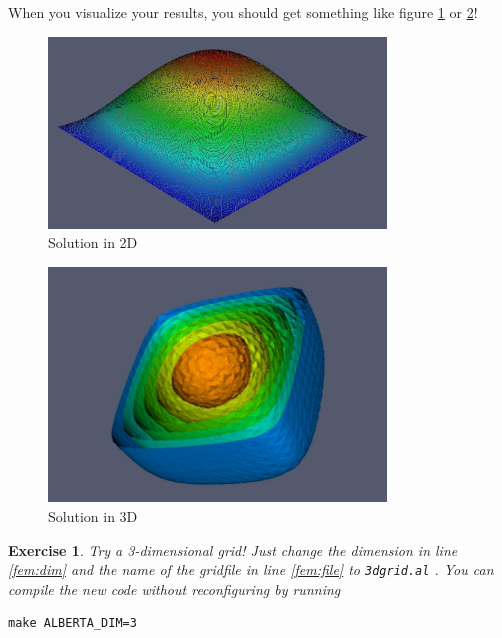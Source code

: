 \documentclass[11pt,a4paper,headinclude,footinclude,DIV16,normalheadings]{scrreprt}
\newtheorem{exc}{Exercise}[chapter]
\begin{document}
When you visualize your results, you should get something like figure \ref{Fig:FEM1} or \ref{Fig:FEM2}!

\begin{figure}[h]
\label{Fig:FEM1}
\begin{center}
\includegraphics[width=0.8\textwidth]{./EPS/fem2d} 
\caption{Solution in 2D}
\end{center}
\end{figure}

\begin{figure}[h]
\label{Fig:FEM2}
\begin{center}
\includegraphics[width=0.8\textwidth]{./EPS/fem3d} 
\caption{Solution in 3D}
\end{center}
\end{figure}

\begin{exc}
 Try a 3-dimensional grid! Just change the dimension in line \ref{fem:dim} and the name of the gridfile in line \ref{fem:file} to \lstinline!3dgrid.al! . You can compile the new code without reconfiguring by running
\begin{lstlisting}
make ALBERTA_DIM=3
\end{lstlisting}
\end{exc}
\end{document}
